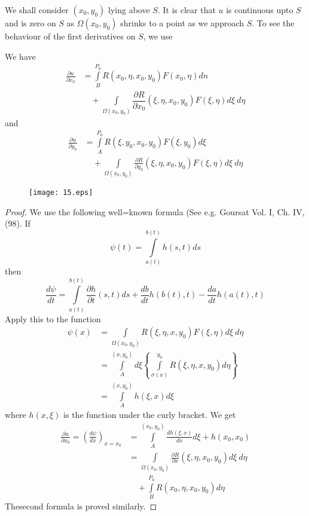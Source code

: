 We shall consider $(x_{0},y_{0})$ lying above $S$. It is clear that $u$ is continuous upto $S$ and is zero on $S$ as $\Omega(x_{0},y_{0})$ shrinks to a point as we approach $S$. To see the behaviour of the first derivatives on $S$, we use

\begin{lemma*}
We have
\begin{align*}
\frac{\partial u}{\partial x_{0}} &= \int\limits^{P_{0}}_{B}R(x_{0},\eta,x_{0},y_{0})F(x_{0},\eta)dn\\[3pt]
&\quad + \int\limits_{\Omega(x_{0},y_{0})}\dfrac{\partial R}{\partial x_{0}}(\xi, \eta, x_{0}, y_{0})F(\xi, \eta)d\xi \ d\eta
\end{align*}
and\pageoriginale
\begin{align*}
\frac{\partial u}{\partial y_{0}} &= \int\limits^{P_{0}}_{A}R(\xi,y_{0},x_{0},y_{0})F(\xi,y_{0})d\xi\\[3pt]
&\quad + \int\limits_{\Omega(x_{0},y_{0})}\frac{\partial R}{\partial y_{0}}(\xi, \eta, x_{0},y_{0})F(\xi,\eta)d\xi \ d\eta
\end{align*}
\begin{figure}[H]
\centering
\texttt{[image: 15.eps]}
\end{figure}
\end{lemma*}

\begin{proof}
We use the following well=known formula (See e.g. Goursat Vol. I, Ch. IV, (98). If
$$
\psi(t)=\int\limits^{b(t)}_{a(t)}h(s,t)ds
$$
then
$$
\frac{d\psi}{dt}=\int\limits^{b(t)}_{a(t)}\frac{\partial h}{\partial t}(s,t)ds+\dfrac{db}{dt}h(b(t),t)-\dfrac{da}{dt}h(a(t),t)
$$
Apply this to the function
\begin{align*}
\psi(x) &= \int\limits_{\Omega(x_{0},y_{0})}R(\xi,\eta,x,y_{0})F(\xi,\eta)d\xi \ d\eta\\[3pt]
&= \int\limits^{(x,y_{0})}_{A}d\xi \left\{\int\limits^{y_{0}}_{\sigma(x)}R(\xi,\eta,x,y_{0})d\eta\right\}\\[3pt]
&= \int\limits^{(x,y_{0})}_{A}h(\xi,x)d\xi
\end{align*}
where $h(x,\xi)$ is the function under the curly bracket. We get
\begin{align*}
\frac{\partial u}{\partial x_{0}}=\left(\frac{d\psi}{dx}\right)_{x=x_{0}} &= \int\limits^{(x_{0},y_{0})}_{A}\frac{dh(\xi,x)}{dx}d\xi+h(x_{0},x_{0})\\[3pt]
&= \int\limits_{\Omega(x_{0},y_{0})}\frac{\partial R}{\partial x}(\xi, \eta, x_{0}, y_{0})d\xi \ d\eta\\[3pt]
&\quad +\int\limits^{P_{0}}_{B}R(x_{0},\eta,x_{0},y_{0})d\eta
\end{align*}
The\pageoriginale second formula is proved similarly.
\end{proof}

